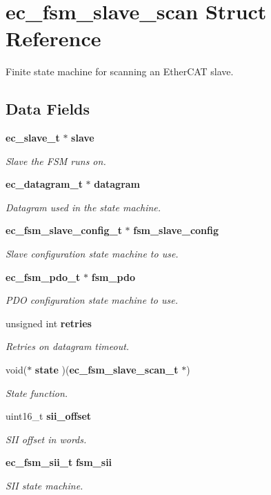 \section{ec\-\_\-fsm\-\_\-slave\-\_\-scan \-Struct \-Reference}
\label{structec__fsm__slave__scan}


\-Finite state machine for scanning an \-Ether\-C\-A\-T slave.  


\subsection*{\-Data \-Fields}
\begin{DoxyCompactItemize}
\item 
{\bf ec\-\_\-slave\-\_\-t} $\ast$ {\bf slave}
\begin{DoxyCompactList}\small\item\em \-Slave the \-F\-S\-M runs on. \end{DoxyCompactList}\item 
{\bf ec\-\_\-datagram\-\_\-t} $\ast$ {\bf datagram}
\begin{DoxyCompactList}\small\item\em \-Datagram used in the state machine. \end{DoxyCompactList}\item 
{\bf ec\-\_\-fsm\-\_\-slave\-\_\-config\-\_\-t} $\ast$ {\bf fsm\-\_\-slave\-\_\-config}
\begin{DoxyCompactList}\small\item\em \-Slave configuration state machine to use. \end{DoxyCompactList}\item 
{\bf ec\-\_\-fsm\-\_\-pdo\-\_\-t} $\ast$ {\bf fsm\-\_\-pdo}
\begin{DoxyCompactList}\small\item\em \-P\-D\-O configuration state machine to use. \end{DoxyCompactList}\item 
unsigned int {\bf retries}
\begin{DoxyCompactList}\small\item\em \-Retries on datagram timeout. \end{DoxyCompactList}\item 
void($\ast$ {\bf state} )({\bf ec\-\_\-fsm\-\_\-slave\-\_\-scan\-\_\-t} $\ast$)
\begin{DoxyCompactList}\small\item\em \-State function. \end{DoxyCompactList}\item 
uint16\-\_\-t {\bf sii\-\_\-offset}
\begin{DoxyCompactList}\small\item\em \-S\-I\-I offset in words. \end{DoxyCompactList}\item 
{\bf ec\-\_\-fsm\-\_\-sii\-\_\-t} {\bf fsm\-\_\-sii}
\begin{DoxyCompactList}\small\item\em \-S\-I\-I state machine. \end{DoxyCompactList}\end{DoxyCompactItemize}


